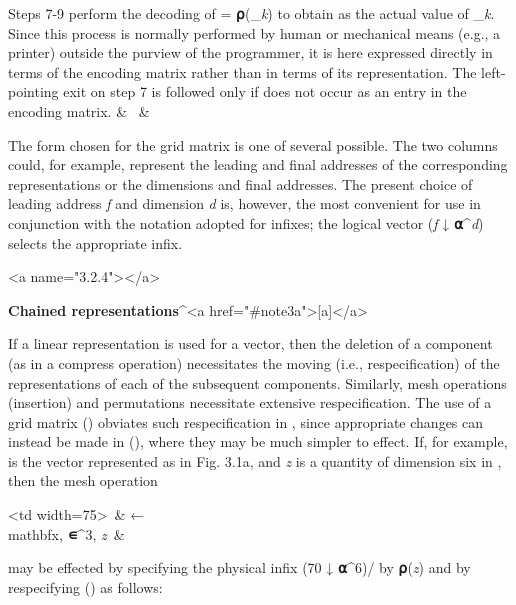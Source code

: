 {\begin{tabularx}
\par Steps 7-9 perform the decoding of  = \textbf{⍴}(_{\textit{k}}) to obtain  as the actual value of _{\textit{k}}. Since this process is normally performed by human or mechanical means (e.g., a printer) outside the purview of the programmer, it is here expressed directly in terms of the encoding matrix  rather than in terms of its representation. The left-pointing exit on step 7 is followed only if  does not occur as an entry in the encoding matrix.
 & \ & \\\end{tabularx}

\par The form chosen for the grid matrix is one of several possible. The two columns could, for example, represent the leading and final addresses of the corresponding representations or the dimensions and final addresses. The present choice of leading address \textit{f} and dimension \textit{d} is, however, the most convenient for use in conjunction with the notation adopted for infixes; the logical vector (\textit{f} ↓ \textbf{⍺}^{\textit{d}}) selects the appropriate infix.



<a name="3.2.4"></a>
\par \textbf{Chained representations}^{<a href="#note3a">[a]</a>}

\par If a linear representation is used for a vector, then the deletion of a component (as in a compress operation) necessitates the moving (i.e., respecification) of the representations of each of the subsequent components. Similarly, mesh operations (insertion) and permutations necessitate extensive respecification. The use of a grid matrix \textbf{\Gamma}() obviates such respecification in , since appropriate changes can instead be made in \textbf{\Gamma}(), where they may be much simpler to effect. If, for example,  is the vector represented as in Fig. 3.1a, and \textit{z} is a quantity of dimension six in \textbf{\pi}, then the mesh operation

\begin{tabularx}<td width=75>\ & 
 ← \\mathbf{x}, \textbf{∊}^{3}, \textit{z}\ & 
\\\end{tabularx}

\par may be effected by specifying the physical infix (70 ↓ \textbf{⍺}^{6})/\textbf{\pi} by 
\textbf{⍴}(\textit{z}) and by respecifying \textbf{\Gamma}() as follows:

}
